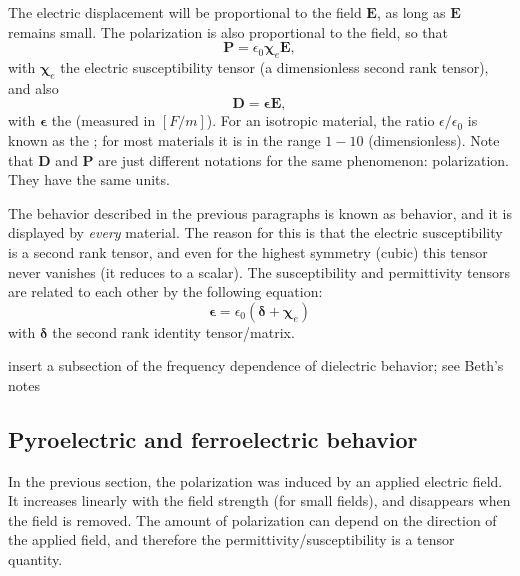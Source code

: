 The electric displacement will be proportional to the field $\mathbf{E}$, as long as $\mathbf{E}$ remains small. The polarization is also proportional to the field, so that 
\begin{equation}
	\mathbf{P} = \epsilon_0\bm{\chi}_e\mathbf{E},
\end{equation}
with $\bm{\chi}_e$ the electric susceptibility tensor (a dimensionless second rank tensor), and also
\begin{equation}
	\mathbf{D} = \bm{\epsilon}\mathbf{E},
\end{equation}
with $\bm{\epsilon}$ the  (measured in $[F/m]$).   For an isotropic material, the ratio $\epsilon/\epsilon_0$ is known as the ; for most materials it is in the range $1-10$ (dimensionless).  Note that $\mathbf{D}$ and $\mathbf{P}$ are just different notations for the same phenomenon: polarization.  They have the same units.

The behavior described in the previous paragraphs is known as  behavior, and it is displayed by \textit{every} material.  The reason for this is that the electric susceptibility is a second rank tensor, and even for the highest symmetry (cubic) this tensor never vanishes (it reduces to a scalar).  The susceptibility and permittivity tensors are related to each other by the following equation:
\begin{equation}
	\bm{\epsilon} = \epsilon_0(\bm{\delta}+\bm{\chi}_e)
\end{equation}
with $\bm{\delta}$ the second rank identity tensor/matrix.

{\color{red}insert a subsection of the frequency dependence of dielectric behavior; see Beth's notes}


\subsection{Pyroelectric and ferroelectric behavior}

In the previous section, the polarization was induced by an applied electric field.  It increases linearly with the field strength (for small fields), and disappears when the field is removed.  The amount of polarization can depend on the direction of the applied field, and therefore the permittivity/susceptibility is a tensor quantity.

